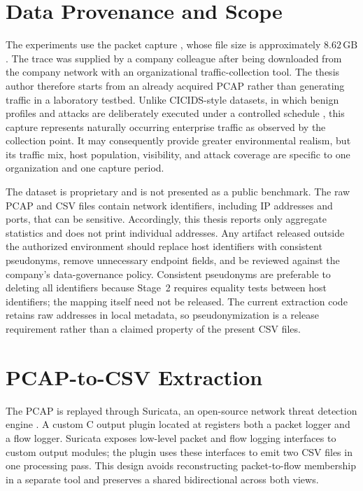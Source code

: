 \documentclass[11pt,fleqn]{report}
\begin{document}
\section{Data Provenance and Scope}
\label{subsec:data_provenance}

The experiments use the packet capture
, whose file size is approximately
$8.62\,\mathrm{GB}$. The trace was supplied by a company colleague after being
downloaded from the company network with an organizational traffic-collection
tool. The thesis author therefore starts from an already acquired PCAP rather
than generating traffic in a laboratory testbed. Unlike CICIDS-style datasets,
in which benign profiles and attacks are deliberately executed under a
controlled schedule \cite{Sharafaldin2018CICIDS}, this capture represents
naturally occurring enterprise traffic as observed by the collection point.
It may consequently provide greater environmental realism, but its traffic
mix, host population, visibility, and attack coverage are specific to one
organization and one capture period.

The dataset is proprietary and is not presented as a public benchmark. The raw
PCAP and CSV files contain network identifiers, including IP addresses and
ports, that can be sensitive. Accordingly, this thesis reports only aggregate
statistics and does not print individual addresses. Any artifact released
outside the authorized environment should replace host identifiers with
consistent pseudonyms, remove unnecessary endpoint fields, and be reviewed
against the company's data-governance policy. Consistent pseudonyms are
preferable to deleting all identifiers because Stage~2 requires equality tests
between host identifiers; the mapping itself need not be released. The current
extraction code retains raw addresses in local metadata, so pseudonymization is
a release requirement rather than a claimed property of the present CSV files.

\section{PCAP-to-CSV Extraction}
\label{subsec:pcap_extraction}

The PCAP is replayed through Suricata, an open-source network threat detection
engine \cite{Roesch1999,SuricataGuide2026}. A custom C output plugin located at
 registers both a packet logger and
a flow logger. Suricata exposes low-level packet and flow logging interfaces to
custom output modules; the plugin uses these interfaces to emit two CSV files
in one processing pass. This design avoids reconstructing packet-to-flow
membership in a separate tool and preserves a shared bidirectional
 across both views.
\end{document}

